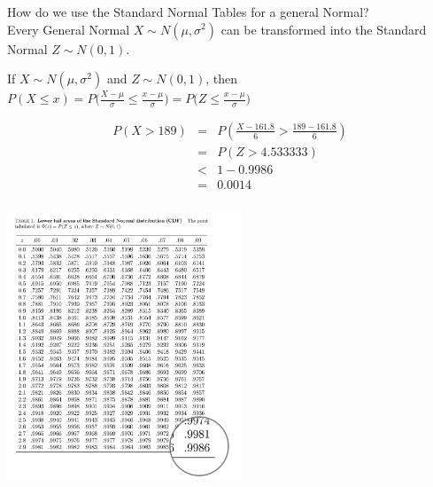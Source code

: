 \documentclass[t,xcolor=pdftex,dvipsnames,table]{beamer}
\begin{document}
\begin{frame}\frametitle{}

How do we use the Standard Normal Tables for a general Normal?  \\ 

\vspace{.5cm} 
Every General Normal $X \sim N(\mu, \sigma^2)$ can be transformed into the Standard Normal $Z \sim N(0,1)$. 

\vspace{.5cm} 
\begin{definition}
If $X \sim N(\mu, \sigma^2)$ and $Z \sim N(0, 1)$, then \\
$P( X \leq x) = P \Big( \frac{X-\mu}{\sigma} \leq \frac{x-\mu}{\sigma}  \Big)= P \Big( Z \leq \frac{x-\mu}{\sigma}  \Big)$
\end{definition}

\begin{eqnarray*}
P(X > 189) & = & P( \frac{X-161.8}{6} > \frac{189-161.8}{6}) \\
& = & P(Z > 4.533333)  \\
& < & 1-0.9986 \\
& = & 0.0014
\end{eqnarray*}
\end{frame}

\begin{frame}[fragile]\frametitle{}

\includegraphics[height=8cm]{../images/NormalTableEg2.jpg}

\end{frame}
\end{document}
